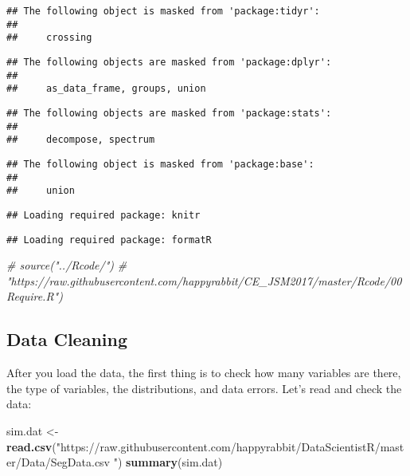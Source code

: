 \documentclass[
]{article}
\newenvironment{Shaded}{\begin{snugshade}}{\end{snugshade}}
\newcommand{\CommentTok}[1]{\textcolor[rgb]{0.56,0.35,0.01}{\textit{#1}}}
\newcommand{\KeywordTok}[1]{\textcolor[rgb]{0.13,0.29,0.53}{\textbf{#1}}}
\newcommand{\NormalTok}[1]{#1}
\newcommand{\StringTok}[1]{\textcolor[rgb]{0.31,0.60,0.02}{#1}}
\begin{document}
\begin{verbatim}
## The following object is masked from 'package:tidyr':
## 
##     crossing
\end{verbatim}

\begin{verbatim}
## The following objects are masked from 'package:dplyr':
## 
##     as_data_frame, groups, union
\end{verbatim}

\begin{verbatim}
## The following objects are masked from 'package:stats':
## 
##     decompose, spectrum
\end{verbatim}

\begin{verbatim}
## The following object is masked from 'package:base':
## 
##     union
\end{verbatim}

\begin{verbatim}
## Loading required package: knitr
\end{verbatim}

\begin{verbatim}
## Loading required package: formatR
\end{verbatim}

\begin{Shaded}
\begin{Highlighting}[]
\CommentTok{# source("../Rcode/") }
  \CommentTok{# "https://raw.githubusercontent.com/happyrabbit/CE_JSM2017/master/Rcode/00Require.R")}
\end{Highlighting}
\end{Shaded}

\hypertarget{data-cleaning}{%
\subsection{Data Cleaning}\label{data-cleaning}}

After you load the data, the first thing is to check how many variables
are there, the type of variables, the distributions, and data errors.
Let's read and check the data:

\begin{Shaded}
\begin{Highlighting}[]
\NormalTok{sim.dat <-}\StringTok{ }\KeywordTok{read.csv}\NormalTok{(}\StringTok{"https://raw.githubusercontent.com/happyrabbit/DataScientistR/master/Data/SegData.csv "}\NormalTok{)}
\KeywordTok{summary}\NormalTok{(sim.dat)}
\end{Highlighting}
\end{Shaded}
\end{document}
